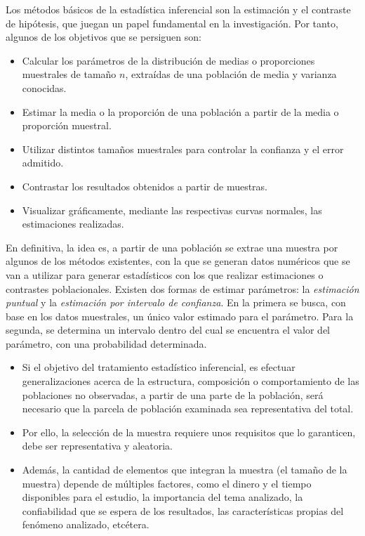Los m\'etodos b\'asicos de la estad\'istica inferencial son la estimaci\'on y el contraste de hip\'otesis, que juegan un papel fundamental en la investigaci\'on. Por tanto, algunos de los objetivos que se persiguen son:

\begin{itemize}
    \item Calcular los par\'ametros de la distribuci\'on de medias o proporciones muestrales de tama\~no $n$, extra\'idas de una poblaci\'on de media y varianza conocidas.
    \item Estimar la media o la proporci\'on de una poblaci\'on a partir de la media o proporci\'on muestral.
    \item Utilizar distintos tama\~nos muestrales para controlar la confianza y el error admitido.
    \item Contrastar los resultados obtenidos a partir de muestras.
    \item Visualizar gr\'aficamente, mediante las respectivas curvas normales, las estimaciones realizadas.
\end{itemize}

En definitiva, la idea es, a partir de una poblaci\'on se extrae una muestra por algunos de los m\'etodos existentes, con la que se generan datos num\'ericos que se van a utilizar para generar estad\'isticos con los que realizar estimaciones o contrastes poblacionales. Existen dos formas de estimar par\'ametros: la \textit{estimaci\'on puntual} y la \textit{estimaci\'on por intervalo de confianza}. En la primera se busca, con base en los datos muestrales, un \'unico valor estimado para el par\'ametro. Para la segunda, se determina un intervalo dentro del cual se encuentra el valor del par\'ametro, con una probabilidad determinada.

\begin{itemize}
    \item Si el objetivo del tratamiento estad\'istico inferencial, es efectuar generalizaciones acerca de la estructura, composici\'on o comportamiento de las poblaciones no observadas, a partir de una parte de la poblaci\'on, ser\'a necesario que la parcela de poblaci\'on examinada sea representativa del total. 
    \item Por ello, la selecci\'on de la muestra requiere unos requisitos que lo garanticen, debe ser representativa y aleatoria. 
    \item Adem\'as, la cantidad de elementos que integran la muestra (el tama\~no de la muestra) depende de m\'ultiples factores, como el dinero y el tiempo disponibles para el estudio, la importancia del tema analizado, la confiabilidad que se espera de los resultados, las caracter\'isticas propias del fen\'omeno analizado, etc\'etera. 
\end{itemize}

